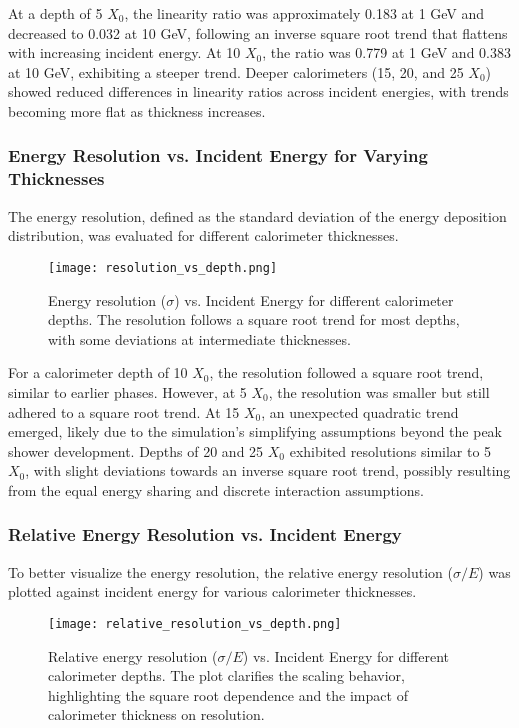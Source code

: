 \documentclass[twocolumn]{aastex631}
\begin{document}
At a depth of 5 \(X_0\), the linearity ratio was approximately 0.183 at 1 GeV and decreased to 0.032 at 10 GeV, following an inverse square root trend that flattens with increasing incident energy. At 10 \(X_0\), the ratio was 0.779 at 1 GeV and 0.383 at 10 GeV, exhibiting a steeper trend. Deeper calorimeters (15, 20, and 25 \(X_0\)) showed reduced differences in linearity ratios across incident energies, with trends becoming more flat as thickness increases.

\subsubsection{Energy Resolution vs. Incident Energy for Varying Thicknesses}

The energy resolution, defined as the standard deviation of the energy deposition distribution, was evaluated for different calorimeter thicknesses.

\begin{figure}[htp]
    \centering
    \texttt{[image: resolution\_vs\_depth.png]}
    \caption{Energy resolution (\(\sigma\)) vs. Incident Energy for different calorimeter depths. The resolution follows a square root trend for most depths, with some deviations at intermediate thicknesses.}
    \label{fig:resolution_vs_depth}
\end{figure}

For a calorimeter depth of 10 \(X_0\), the resolution followed a square root trend, similar to earlier phases. However, at 5 \(X_0\), the resolution was smaller but still adhered to a square root trend. At 15 \(X_0\), an unexpected quadratic trend emerged, likely due to the simulation's simplifying assumptions beyond the peak shower development. Depths of 20 and 25 \(X_0\) exhibited resolutions similar to 5 \(X_0\), with slight deviations towards an inverse square root trend, possibly resulting from the equal energy sharing and discrete interaction assumptions.

\subsubsection{Relative Energy Resolution vs. Incident Energy}

To better visualize the energy resolution, the relative energy resolution (\(\sigma/E\)) was plotted against incident energy for various calorimeter thicknesses.

\begin{figure}[htp]
    \centering
    \texttt{[image: relative\_resolution\_vs\_depth.png]}
    \caption{Relative energy resolution (\(\sigma/E\)) vs. Incident Energy for different calorimeter depths. The plot clarifies the scaling behavior, highlighting the square root dependence and the impact of calorimeter thickness on resolution.}
    \label{fig:relative_resolution_vs_depth}
\end{figure}
\end{document}
